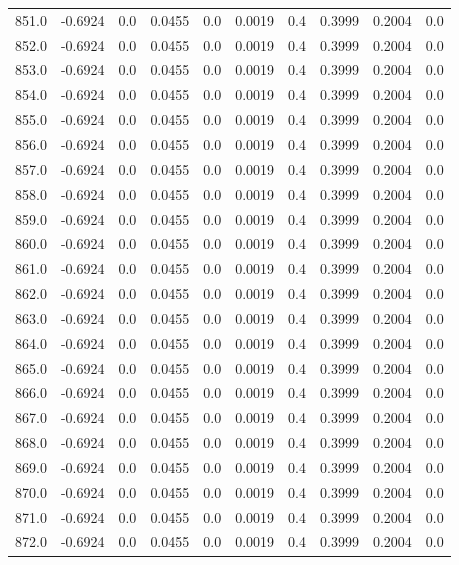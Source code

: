 \begin{longtable}{lrrrrrrrrr}
851.0 & -0.6924 & 0.0 & 0.0455 & 0.0 & 0.0019 & 0.4 & 0.3999 & 0.2004 & 0.0 \\
852.0 & -0.6924 & 0.0 & 0.0455 & 0.0 & 0.0019 & 0.4 & 0.3999 & 0.2004 & 0.0 \\
853.0 & -0.6924 & 0.0 & 0.0455 & 0.0 & 0.0019 & 0.4 & 0.3999 & 0.2004 & 0.0 \\
854.0 & -0.6924 & 0.0 & 0.0455 & 0.0 & 0.0019 & 0.4 & 0.3999 & 0.2004 & 0.0 \\
855.0 & -0.6924 & 0.0 & 0.0455 & 0.0 & 0.0019 & 0.4 & 0.3999 & 0.2004 & 0.0 \\
856.0 & -0.6924 & 0.0 & 0.0455 & 0.0 & 0.0019 & 0.4 & 0.3999 & 0.2004 & 0.0 \\
857.0 & -0.6924 & 0.0 & 0.0455 & 0.0 & 0.0019 & 0.4 & 0.3999 & 0.2004 & 0.0 \\
858.0 & -0.6924 & 0.0 & 0.0455 & 0.0 & 0.0019 & 0.4 & 0.3999 & 0.2004 & 0.0 \\
859.0 & -0.6924 & 0.0 & 0.0455 & 0.0 & 0.0019 & 0.4 & 0.3999 & 0.2004 & 0.0 \\
860.0 & -0.6924 & 0.0 & 0.0455 & 0.0 & 0.0019 & 0.4 & 0.3999 & 0.2004 & 0.0 \\
861.0 & -0.6924 & 0.0 & 0.0455 & 0.0 & 0.0019 & 0.4 & 0.3999 & 0.2004 & 0.0 \\
862.0 & -0.6924 & 0.0 & 0.0455 & 0.0 & 0.0019 & 0.4 & 0.3999 & 0.2004 & 0.0 \\
863.0 & -0.6924 & 0.0 & 0.0455 & 0.0 & 0.0019 & 0.4 & 0.3999 & 0.2004 & 0.0 \\
864.0 & -0.6924 & 0.0 & 0.0455 & 0.0 & 0.0019 & 0.4 & 0.3999 & 0.2004 & 0.0 \\
865.0 & -0.6924 & 0.0 & 0.0455 & 0.0 & 0.0019 & 0.4 & 0.3999 & 0.2004 & 0.0 \\
866.0 & -0.6924 & 0.0 & 0.0455 & 0.0 & 0.0019 & 0.4 & 0.3999 & 0.2004 & 0.0 \\
867.0 & -0.6924 & 0.0 & 0.0455 & 0.0 & 0.0019 & 0.4 & 0.3999 & 0.2004 & 0.0 \\
868.0 & -0.6924 & 0.0 & 0.0455 & 0.0 & 0.0019 & 0.4 & 0.3999 & 0.2004 & 0.0 \\
869.0 & -0.6924 & 0.0 & 0.0455 & 0.0 & 0.0019 & 0.4 & 0.3999 & 0.2004 & 0.0 \\
870.0 & -0.6924 & 0.0 & 0.0455 & 0.0 & 0.0019 & 0.4 & 0.3999 & 0.2004 & 0.0 \\
871.0 & -0.6924 & 0.0 & 0.0455 & 0.0 & 0.0019 & 0.4 & 0.3999 & 0.2004 & 0.0 \\
872.0 & -0.6924 & 0.0 & 0.0455 & 0.0 & 0.0019 & 0.4 & 0.3999 & 0.2004 & 0.0 \\

\end{longtable}
